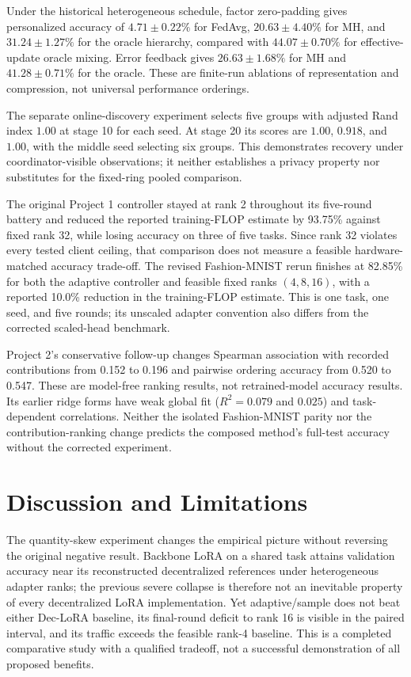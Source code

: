 \documentclass[11pt]{article}
\begin{document}
Under the historical heterogeneous schedule, factor zero-padding gives personalized accuracy of $4.71\pm0.22\%$ for FedAvg, $20.63\pm4.40\%$ for MH, and $31.24\pm1.27\%$ for the oracle hierarchy, compared with $44.07\pm0.70\%$ for effective-update oracle mixing. Error feedback gives $26.63\pm1.68\%$ for MH and $41.28\pm0.71\%$ for the oracle. These are finite-run ablations of representation and compression, not universal performance orderings.

The separate online-discovery experiment selects five groups with adjusted Rand index $1.00$ at stage 10 for each seed. At stage 20 its scores are $1.00$, $0.918$, and $1.00$, with the middle seed selecting six groups. This demonstrates recovery under coordinator-visible observations; it neither establishes a privacy property nor substitutes for the fixed-ring pooled comparison.

The original Project 1 controller stayed at rank 2 throughout its five-round battery and reduced the reported training-FLOP estimate by 93.75\% against fixed rank 32, while losing accuracy on three of five tasks. Since rank 32 violates every tested client ceiling, that comparison does not measure a feasible hardware-matched accuracy trade-off. The revised Fashion-MNIST rerun finishes at 82.85\% for both the adaptive controller and feasible fixed ranks $(4,8,16)$, with a reported 10.0\% reduction in the training-FLOP estimate. This is one task, one seed, and five rounds; its unscaled adapter convention also differs from the corrected scaled-head benchmark.

Project 2's conservative follow-up changes Spearman association with recorded contributions from 0.152 to 0.196 and pairwise ordering accuracy from 0.520 to 0.547. These are model-free ranking results, not retrained-model accuracy results. Its earlier ridge forms have weak global fit ($R^2=0.079$ and $0.025$) and task-dependent correlations. Neither the isolated Fashion-MNIST parity nor the contribution-ranking change predicts the composed method's full-test accuracy without the corrected experiment.

\section{Discussion and Limitations}
The quantity-skew experiment changes the empirical picture without reversing the original negative result. Backbone LoRA on a shared task attains validation accuracy near its reconstructed decentralized references under heterogeneous adapter ranks; the previous severe collapse is therefore not an inevitable property of every decentralized LoRA implementation. Yet adaptive/sample does not beat either Dec-LoRA baseline, its final-round deficit to rank 16 is visible in the paired interval, and its traffic exceeds the feasible rank-4 baseline. This is a completed comparative study with a qualified tradeoff, not a successful demonstration of all proposed benefits.
\end{document}

